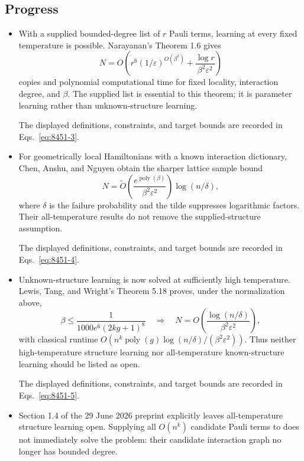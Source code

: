 \subsection*{Progress}

\begin{itemize}
  \item With a supplied bounded-degree list of $r$ Pauli terms, learning at every fixed temperature is possible. Narayanan's Theorem 1.6 gives
  \begin{equation}
N=O\!\left(r^6(1/\varepsilon)^{O(\beta^2)}
  +\frac{\log r}{\beta^2\varepsilon^2}\right)
\label{eq:8451-3}
\end{equation}
  copies and polynomial computational time for fixed locality, interaction degree, and $\beta$. The supplied list is essential to this theorem; it is parameter learning rather than unknown-structure learning. 

The displayed definitions, constraints, and target bounds are recorded in Eqs.~\eqref{eq:8451-3}.

  \item For geometrically local Hamiltonians with a known interaction dictionary, Chen, Anshu, and Nguyen obtain the sharper lattice sample bound
  \begin{equation}
N=\widetilde O\!\left(\frac{e^{\operatorname{poly}(\beta)}}{\beta^2\varepsilon^2}\right)\log(n/\delta),
\label{eq:8451-4}
\end{equation}
  where $\delta$ is the failure probability and the tilde suppresses logarithmic factors. Their all-temperature results do not remove the supplied-structure assumption. 

The displayed definitions, constraints, and target bounds are recorded in Eqs.~\eqref{eq:8451-4}.

  \item Unknown-structure learning is now solved at sufficiently high temperature. Lewis, Tang, and Wright's Theorem 5.18 proves, under the normalization above,
  \begin{equation}
\beta\leq\frac{1}{1000e^6(2kg+1)^8}
  \quad\Longrightarrow\quad
  N=O\!\left(\frac{\log(n/\delta)}{\beta^2\varepsilon^2}\right),
\label{eq:8451-5}
\end{equation}
  with classical runtime $O(n^k\operatorname{poly}(g)\log(n/\delta)/(\beta^2\varepsilon^2))$. Thus neither high-temperature structure learning nor all-temperature known-structure learning should be listed as open. 

The displayed definitions, constraints, and target bounds are recorded in Eqs.~\eqref{eq:8451-5}.

  \item Section 1.4 of the 29 June 2026 preprint explicitly leaves all-temperature structure learning open. Supplying all $O(n^k)$ candidate Pauli terms to  does not immediately solve the problem: their candidate interaction graph no longer has bounded degree. 
\end{itemize}

